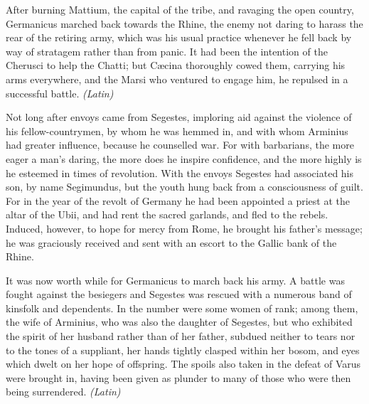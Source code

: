After burning Mattium, the capital of the tribe, and ravaging the open country, Germanicus marched back towards the Rhine, the enemy not daring to harass the rear of the retiring army, which was his usual practice whenever he fell back by way of stratagem rather than from panic. It had been the intention of the Cherusci to help the Chatti; but Cæcina thoroughly cowed them, carrying his arms everywhere, and the Marsi who ventured to engage him, he repulsed in a successful battle. \emph{(Latin)}


Not long after envoys came from Segestes, imploring aid against the violence of his fellow-countrymen, by whom he was hemmed in, and with whom Arminius had greater influence, because he counselled war. For with barbarians, the more eager a man's daring, the more does he inspire confidence, and the more highly is he esteemed in times of revolution. With the envoys Segestes had associated his son, by name Segimundus, but the youth hung back from a consciousness of guilt. For in the year of the revolt of Germany he had been appointed a priest at the altar of the Ubii, and had rent the sacred garlands, and fled to the rebels. Induced, however, to hope for mercy from Rome, he brought his father's message; he was graciously received and sent with an escort to the Gallic bank of the Rhine.

It was now worth while for Germanicus to march back his army. A battle was fought against the besiegers and Segestes was rescued with a numerous band of kinsfolk and dependents. In the number were some women of rank; among them, the wife of Arminius, who was also the daughter of Segestes, but who exhibited the spirit of her husband rather than of her father, subdued neither to tears nor to the tones of a suppliant, her hands tightly clasped within her bosom, and eyes which dwelt on her hope of offspring. The spoils also taken in the defeat of Varus were brought in, having been given as plunder to many of those who were then being surrendered. \emph{(Latin)}


